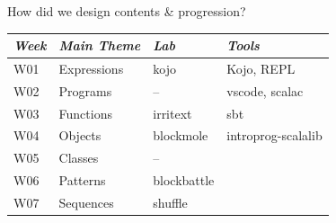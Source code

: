 \documentclass[aspectratio=169]{beamer}
\newenvironment{Slide}[1]%
  {\begin{frame}[environment=Slide]{#1}}
  {\end{frame}}%
\begin{document}
\begin{Slide}{How did we design contents \& progression?}
  \begin{minipage}{0.55\textwidth}
    \fontsize{8.7}{10}\selectfont
    \begin{tabular}{|l|l|l|l|} 
      \textit{Week} & \textit{Main Theme} & \textit{Lab} & \textit{Tools}\\ \hline \hline
      W01 & Expressions     & kojo        & Kojo, REPL\\
      W02 & Programs        & --          & vscode, scalac\\
      W03 & Functions       & irritext    & sbt\\
      W04 & Objects         & blockmole   & introprog-scalalib\\
      W05 & Classes         & --          & \\
      W06 & Patterns        & blockbattle & \\
      W07 & Sequences       &  shuffle    & \\ \hline 

\end{tabular}
\end{minipage}
\end{Slide}
\end{document}
